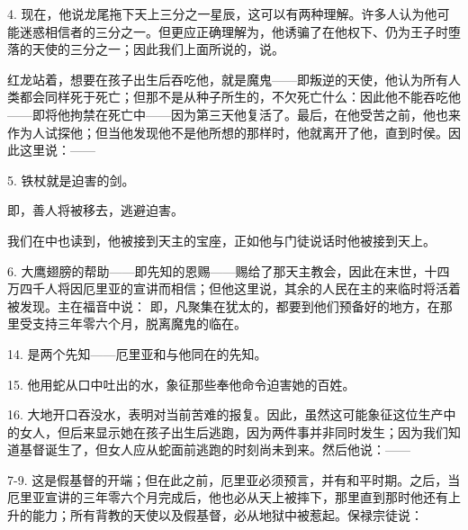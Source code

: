 4.  现在，他说龙尾拖下天上三分之一星辰，这可以有两种理解。许多人认为他可能迷惑相信者的三分之一。但更应正确理解为，他诱骗了在他权下、仍为王子时堕落的天使的三分之一；因此我们上面所说的，说。\par

 红龙站着，想要在孩子出生后吞吃他，就是魔鬼——即叛逆的天使，他认为所有人类都会同样死于死亡；但那不是从种子所生的，不欠死亡什么：因此他不能吞吃他——即将他拘禁在死亡中——因为第三天他复活了。最后，在他受苦之前，他也来作为人试探他；但当他发现他不是他所想的那样时，他就离开了他，直到时侯。因此这里说：——\par

5.  铁杖就是迫害的剑。\par

 即，善人将被移去，逃避迫害。\par

 我们在中也读到，他被接到天主的宝座，正如他与门徒说话时他被接到天上。\par

6.  大鹰翅膀的帮助——即先知的恩赐——赐给了那天主教会，因此在末世，十四万四千人将因厄里亚的宣讲而相信；但他这里说，其余的人民在主的来临时将活着被发现。主在福音中说：  即，凡聚集在犹太的，都要到他们预备好的地方，在那里受支持三年零六个月，脱离魔鬼的临在。\par

14.  是两个先知——厄里亚和与他同在的先知。\par

15.  他用蛇从口中吐出的水，象征那些奉他命令迫害她的百姓。\par

16.  大地开口吞没水，表明对当前苦难的报复。因此，虽然这可能象征这位生产中的女人，但后来显示她在孩子出生后逃跑，因为两件事并非同时发生；因为我们知道基督诞生了，但女人应从蛇面前逃跑的时刻尚未到来。然后他说：——\par

7-9.  这是假基督的开端；但在此之前，厄里亚必须预言，并有和平时期。之后，当厄里亚宣讲的三年零六个月完成后，他也必从天上被摔下，那里直到那时他还有上升的能力；所有背教的天使以及假基督，必从地狱中被惹起。保禄宗徒说： \par

